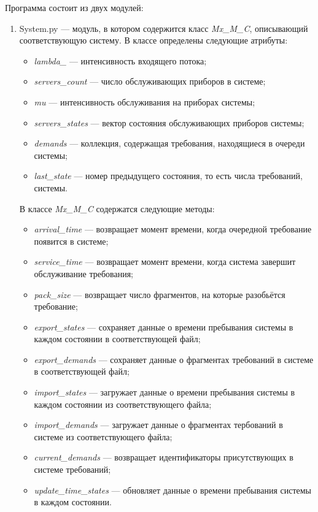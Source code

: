 \documentclass[bachelor, och, pract, times]{SCWorks}
\begin{document}
Программа состоит из двух модулей:
\begin{enumerate}
\item System.py — модуль, в котором содержится класс \textit{Mx\_M\_C}, описывающий соответствующую систему. В классе определены следующие атрибуты:
\begin{itemize}
    \item \textit{lambda\_} — интенсивность входящего потока;
    \item \textit{servers\_count} — число обслуживающих приборов в системе;
    \item \textit{mu} — интенсивность обслуживания на приборах системы;
    \item \textit{servers\_states} — вектор состояния обслуживающих приборов системы;
    \item  \textit{demands} — коллекция, содержащая требования, находящиеся в очереди системы;
    \item \textit{last\_state} — номер предыдущего состояния, то есть числа требований, системы.
\end{itemize}
В классе \textit{Mx\_M\_C} содержатся следующие методы:
\begin{itemize}
    \item \textit{arrival\_time} — возвращает момент времени, когда очередной требование появится в системе;
    \item \textit{service\_time} — возвращает момент времени, когда система завершит обслуживание требования;
    \item \textit{pack\_size} — возвращает число фрагментов, на которые разобьётся требование;
    \item \textit{export\_states} — сохраняет данные о времени пребывания системы в каждом состоянии в соответствующей файл;
    \item \textit{export\_demands} — сохраняет данные о фрагментах требований в системе в соответствующей файл;
    \item \textit{import\_states} — загружает данные о времени пребывания системы в каждом состоянии из соответствующего файла;
    \item \textit{import\_demands} — загружает данные о фрагментах тербований в системе из соответствующего файла;
    \item \textit{current\_demands} — возвращает идентификаторы присутствующих в системе требований;
    \item \textit{update\_time\_states} — обновляет данные о времени пребывания системы в каждом состоянии.
\end{itemize}


\end{enumerate}
\end{document}
